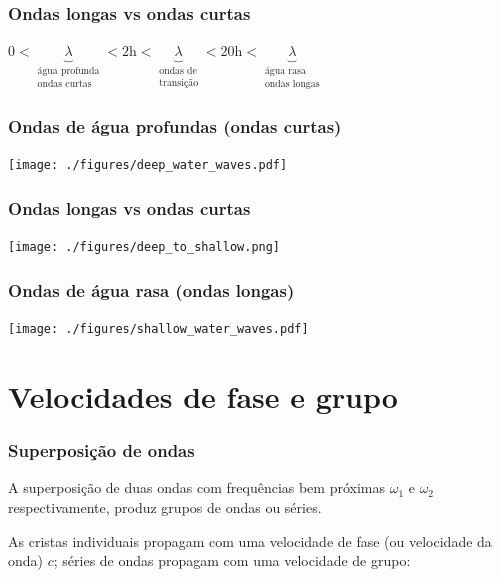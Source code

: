 \begin{frame}
\frametitle{Ondas longas vs ondas curtas}
  \small{
  \begin{block}{}
  \begin{center}
    $0 < \underbrace{\lambda}_{\substack{\text{água profunda} \\\text{ondas curtas}}}
    < 2 \text{h} < \underbrace{\lambda}_{\substack{\text{ondas de} \\\text{transição}}}
    < 20 \text{h} < \underbrace{\lambda}_{\substack{\text{água rasa} \\\text{ondas longas}}}$
  \end{center}
  \end{block}
}
\end{frame}

\begin{frame}
\frametitle{Ondas de água profundas (ondas curtas)}
    \begin{center}
        \texttt{[image: ./figures/deep\_water\_waves.pdf]}
    \end{center}
\end{frame}

\begin{frame}
\frametitle{Ondas longas vs ondas curtas}
    \begin{center}
        \texttt{[image: ./figures/deep\_to\_shallow.png]}
    \end{center}
\end{frame}

\begin{frame}
\frametitle{Ondas de água rasa (ondas longas)}
    \begin{center}
        \texttt{[image: ./figures/shallow\_water\_waves.pdf]}
    \end{center}
\end{frame}


\section{Velocidades de fase e grupo}
\begin{frame}
\frametitle{Superposição de ondas}
    \begin{block}{}
        A superposição de duas ondas com frequências bem próximas $\omega_1$ e
        $\omega_2$ respectivamente, produz grupos de ondas ou séries.
    \end{block}

    \pause
    \begin{block}{}
        As cristas individuais propagam com uma velocidade de fase (ou
        velocidade da onda) $c$;  séries de ondas propagam com uma velocidade
        de grupo:
    \end{block}
\end{frame}

